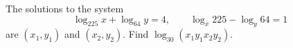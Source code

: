 The solutions to the system
\[\log_{225}x+\log_{64}y=4,\qquad\log_x225-\log_y64=1\]
are $(x_1,y_1)$ and $(x_2,y_2)$. Find $\log_{30}\left(x_1y_1x_2y_2\right)$.
